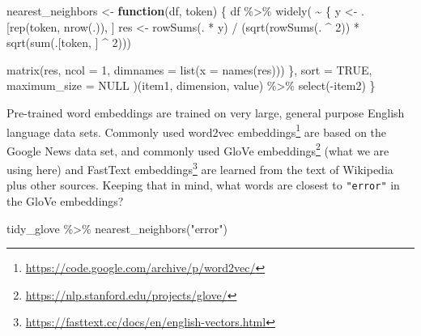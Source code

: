 \documentclass[
]{krantz}
\makeatletter
\newenvironment{Shaded}{\begin{snugshade}}{\end{snugshade}}
\newcommand{\AttributeTok}[1]{\textcolor[rgb]{0.77,0.63,0.00}{#1}}
\newcommand{\ConstantTok}[1]{\textcolor[rgb]{0.00,0.00,0.00}{#1}}
\newcommand{\ControlFlowTok}[1]{\textcolor[rgb]{0.13,0.29,0.53}{\textbf{#1}}}
\newcommand{\DecValTok}[1]{\textcolor[rgb]{0.00,0.00,0.81}{#1}}
\newcommand{\FunctionTok}[1]{\textcolor[rgb]{0.00,0.00,0.00}{#1}}
\newcommand{\NormalTok}[1]{#1}
\newcommand{\OtherTok}[1]{\textcolor[rgb]{0.56,0.35,0.01}{#1}}
\newcommand{\SpecialCharTok}[1]{\textcolor[rgb]{0.00,0.00,0.00}{#1}}
\newcommand{\StringTok}[1]{\textcolor[rgb]{0.31,0.60,0.02}{#1}}
\DeclareRobustCommand{\href}[2]{#2\footnote{\url{#1}}}
\renewcommand{\href}[2]{#2\footnote{\url{#1}}}
\newenvironment{kframe}{%
\medskip{}
\setlength{\fboxsep}{.8em}
 \def\at@end@of@kframe{}%
 \ifinner\ifhmode%
  \def\at@end@of@kframe{\end{minipage}}%
  \begin{minipage}{\columnwidth}%
 \fi\fi%
 \def\FrameCommand##1{\hskip\@totalleftmargin \hskip-\fboxsep
 \colorbox{shadecolor}{##1}\hskip-\fboxsep
     \hskip-\linewidth \hskip-\@totalleftmargin \hskip\columnwidth}%
 \MakeFramed {\advance\hsize-\width
   \@totalleftmargin\z@ \linewidth\hsize
   \@setminipage}}%
 {\par\unskip\endMakeFramed%
 \at@end@of@kframe}
\renewenvironment{Shaded}{\begin{kframe}}{\end{kframe}}
\makeatother
\begin{document}
\begin{Shaded}
\begin{Highlighting}[]
\NormalTok{nearest\_neighbors }\OtherTok{\textless{}{-}} \ControlFlowTok{function}\NormalTok{(df, token) \{}
\NormalTok{  df }\SpecialCharTok{\%\textgreater{}\%}
    \FunctionTok{widely}\NormalTok{(}
      \SpecialCharTok{\textasciitilde{}}\NormalTok{ \{}
\NormalTok{        y }\OtherTok{\textless{}{-}}\NormalTok{ .[}\FunctionTok{rep}\NormalTok{(token, }\FunctionTok{nrow}\NormalTok{(.)), ]}
\NormalTok{        res }\OtherTok{\textless{}{-}} \FunctionTok{rowSums}\NormalTok{(. }\SpecialCharTok{*}\NormalTok{ y) }\SpecialCharTok{/} 
\NormalTok{          (}\FunctionTok{sqrt}\NormalTok{(}\FunctionTok{rowSums}\NormalTok{(. }\SpecialCharTok{\^{}} \DecValTok{2}\NormalTok{)) }\SpecialCharTok{*} \FunctionTok{sqrt}\NormalTok{(}\FunctionTok{sum}\NormalTok{(.[token, ] }\SpecialCharTok{\^{}} \DecValTok{2}\NormalTok{)))}

        \FunctionTok{matrix}\NormalTok{(res, }\AttributeTok{ncol =} \DecValTok{1}\NormalTok{, }\AttributeTok{dimnames =} \FunctionTok{list}\NormalTok{(}\AttributeTok{x =} \FunctionTok{names}\NormalTok{(res)))}
\NormalTok{        \},}
      \AttributeTok{sort =} \ConstantTok{TRUE}\NormalTok{,}
      \AttributeTok{maximum\_size =} \ConstantTok{NULL}
\NormalTok{    )(item1, dimension, value) }\SpecialCharTok{\%\textgreater{}\%}
    \FunctionTok{select}\NormalTok{(}\SpecialCharTok{{-}}\NormalTok{item2)}
\NormalTok{\}}
\end{Highlighting}
\end{Shaded}

Pre-trained word embeddings are trained on very large, general purpose English language data sets. Commonly used \href{https://code.google.com/archive/p/word2vec/}{word2vec embeddings} are based on the Google News data set, and commonly used \href{https://nlp.stanford.edu/projects/glove/}{GloVe embeddings} (what we are using here) and \href{https://fasttext.cc/docs/en/english-vectors.html}{FastText embeddings} are learned from the text of Wikipedia plus other sources. Keeping that in mind, what words are closest to \texttt{"error"} in the GloVe embeddings?

\begin{Shaded}
\begin{Highlighting}[]
\NormalTok{tidy\_glove }\SpecialCharTok{\%\textgreater{}\%}
    \FunctionTok{nearest\_neighbors}\NormalTok{(}\StringTok{"error"}\NormalTok{)}
\end{Highlighting}
\end{Shaded}
\end{document}
